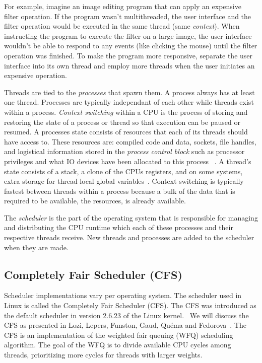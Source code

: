 \documentclass{sig-alternate}
\begin{document}
For example, imagine an image editing program that can apply an expensive filter operation. If the program wasn't multithreaded, the user interface and the filter operation would be executed in the same thread (same \emph{context}). When instructing the program to execute the filter on a large image, the user interface wouldn't be able to respond to any events (like clicking the mouse) until the filter operation was finished. To make the program more responsive, separate the user interface into its own thread and employ more threads when the user initiates an expensive operation.
	
Threads are tied to the \emph{processes} that spawn them. A process always has at least one thread. Processes are typically independant of each other while threads exist within a process. \emph{Context switching} within a CPU is the process of storing and restoring the state of a process or thread so that execution can be paused or resumed. A processes state consists of resources that each of its threads should have access to. These resources are: compiled code and data, sockets, file handles, and logistical information stored in the \emph{process control block} such as processor privileges and what IO devices have been allocated to this process ~\cite{WikiProcessControlBlock,WikiThreads}. A thread's state consists of a stack, a clone of the CPUs registers, and on some systems, extra storage for thread-local global variables~\cite{WikiThreads,WikiThreadLocalStorage}. Context switching is typically fastest between threads within a process because a bulk of the data that is required to be available, the resources, is already available.~\cite{WikiThreads} 

The \emph{scheduler} is the part of the operating system that is responsible for managing and distributing the CPU runtime which each of these processes and their respective threads receive. New threads and processes are added to the scheduler when they are made.~\cite{Lozi:2016}

\subsection{Completely Fair Scheduler (CFS)}
\label{sec:cfs}

Scheduler implementations vary per operating system. The scheduler used in Linux is called the Completely Fair Scheduler (CFS). The CFS was introduced as the default scheduler in version 2.6.23 of the Linux kernel.~\cite{JoEtal:2017} We will discuss the CFS as presented in Lozi, Lepers, Funston, Gaud, Qu\'ema and Fedorova~\cite{Lozi:2016}. The CFS is an implementation of the weighted fair queuing (WFQ) scheduling algorithm. The goal of the WFQ is to divide available CPU cycles among threads, prioritizing more cycles for threads with larger weights.~\cite{Lozi:2016}
\end{document}
